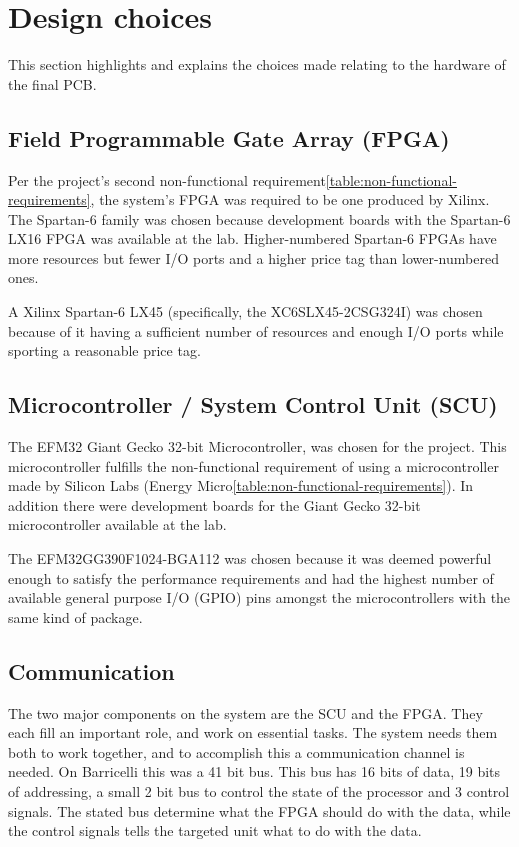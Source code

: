 \section{Design choices} 
\label{pcb:design-choices}
This section highlights and explains the choices made relating to the hardware of the final PCB.

\subsection{Field Programmable Gate Array (FPGA)} \label{pcb:design-choices:ss:fpga}
Per the project's second non-functional requirement\vref{table:non-functional-requirements}, the system's FPGA was required to be one produced by Xilinx.
The Spartan-6 family was chosen because development boards with the Spartan-6 LX16 FPGA was available at the lab.
Higher-numbered Spartan-6 FPGAs have more resources but fewer I/O ports and a higher price tag than lower-numbered ones.

A Xilinx Spartan-6 LX45 (specifically, the XC6SLX45-2CSG324I) was chosen because of it having a sufficient number of resources and enough I/O ports while sporting a reasonable price tag.

\subsection{Microcontroller / System Control Unit (SCU)} \label{pcb:design-choices:ss:scu}
The EFM32 Giant Gecko 32-bit Microcontroller, was chosen for the project.
This microcontroller fulfills the non-functional requirement of using a microcontroller made by Silicon Labs (Energy Micro\vref{table:non-functional-requirements}).
In addition there were development boards for the Giant Gecko 32-bit microcontroller available at the lab.

The EFM32GG390F1024-BGA112 was chosen because it was deemed powerful enough to satisfy the performance requirements and had the highest number of available general purpose I/O (GPIO) pins amongst the microcontrollers with the same kind of package.

\subsection{Communication} \label{pcb:design-choices:ss:internal_communication}
The two major components on the system are the SCU and the FPGA.
They each fill an important role, and work on essential tasks.
The system needs them both to work together, and to accomplish this a communication channel is needed.
On Barricelli this was a 41 bit bus.
This bus has 16 bits of data, 19 bits of addressing, a small 2 bit bus to control the state of the processor and 3 control signals.
The stated bus determine what the FPGA should do with the data, while the control signals tells the targeted unit what to do with the data. 



